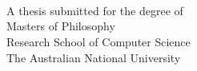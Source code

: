 
\begin{titlepage}
  \enlargethispage{2cm}
  \begin{center}
    \makeatletter
    \Huge\textbf{\@title} \\[.4cm]
    \Huge\textbf{\thesisqualifier} \\[2.5cm]
    \huge\textbf{\@author} \\[9cm]
    \makeatother
    \LARGE A thesis submitted for the degree of \\
    Masters of Philosophy\\
    Research School of Computer Science\\
    The Australian National University \\[2cm]
    \thismonth
  \end{center}
\end{titlepage}
